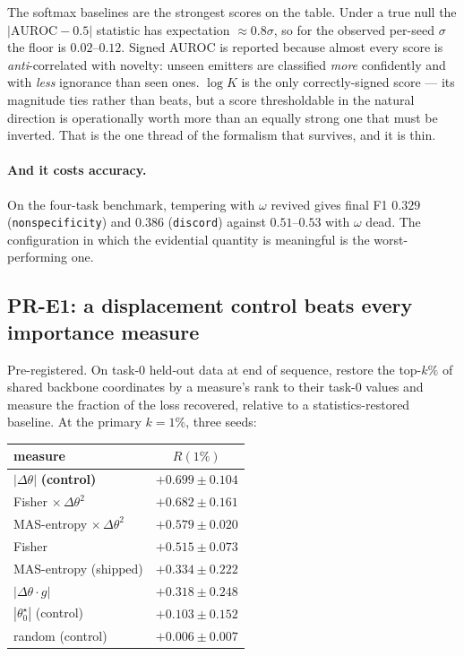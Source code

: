 \documentclass{article}
\begin{document}
The softmax baselines are the strongest scores on the table. Under a true null
the $|\mathrm{AUROC}-0.5|$ statistic has expectation $\approx 0.8\sigma$, so for
the observed per-seed $\sigma$ the floor is $0.02$--$0.12$. Signed AUROC is
reported because almost every score is \emph{anti}-correlated with novelty:
unseen emitters are classified \emph{more} confidently and with \emph{less}
ignorance than seen ones. $\log K$ is the only correctly-signed score --- its
magnitude ties rather than beats, but a score thresholdable in the natural
direction is operationally worth more than an equally strong one that must be
inverted. That is the one thread of the formalism that survives, and it is thin.

\paragraph{And it costs accuracy.} On the four-task benchmark, tempering with
$\omega$ revived gives final F1 $0.329$ (\texttt{nonspecificity}) and $0.386$
(\texttt{discord}) against $0.51$--$0.53$ with $\omega$ dead. The configuration in
which the evidential quantity is meaningful is the worst-performing one.

\subsection{PR-E1: a displacement control beats every importance measure}
\label{sec:pre1}

Pre-registered. On task-0 held-out data at end of sequence, restore the top-$k\%$
of shared backbone coordinates by a measure's rank to their task-0 values and
measure the fraction of the loss recovered, relative to a
statistics-restored baseline. At the primary $k=1\%$, three seeds:

\begin{center}
\begin{tabular}{lc}
\toprule
measure & $R(1\%)$ \\
\midrule
$|\Delta\theta|$ \textbf{(control)} & $\mathbf{+0.699 \pm 0.104}$ \\
Fisher $\times\,\Delta\theta^2$     & $+0.682 \pm 0.161$ \\
MAS-entropy $\times\,\Delta\theta^2$ & $+0.579 \pm 0.020$ \\
Fisher                              & $+0.515 \pm 0.073$ \\
MAS-entropy (shipped)               & $+0.334 \pm 0.222$ \\
$|\Delta\theta \cdot g|$            & $+0.318 \pm 0.248$ \\
$|\theta_0^\star|$ (control)        & $+0.103 \pm 0.152$ \\
random (control)                    & $+0.006 \pm 0.007$ \\
\bottomrule
\end{tabular}
\end{center}
\end{document}
